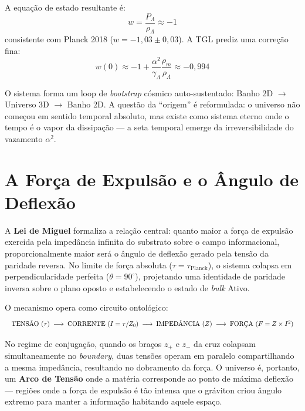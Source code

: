 \documentclass[12pt,a4paper,twoside]{article}
\newcommand{\alphaii}{\alpha^{2}}
\newcommand{\boundary}{\textit{boundary}}
\newcommand{\bulk}{\textit{bulk}}
\begin{document}
A equa\c{c}\~ao de estado resultante \'e:
\begin{equation}
w = \frac{P_\Lambda}{\rho_\Lambda} \approx -1
\label{eq:w}
\end{equation}
consistente com Planck 2018 ($w = -1{,}03 \pm 0{,}03$). A TGL prediz uma corre\c{c}\~ao fina:
\begin{equation}
w(0) \approx -1 + \frac{\alphaii}{\gamma_\Lambda}\frac{\rho_m}{\rho_\Lambda} \approx -0{,}994
\label{eq:w_correcao}
\end{equation}

O sistema forma um loop de \textit{bootstrap} c\'osmico auto-sustentado: Banho 2D $\to$ Universo 3D $\to$ Banho 2D. A quest\~ao da ``origem'' \'e reformulada: o universo n\~ao come\c{c}ou em sentido temporal absoluto, mas existe como sistema eterno onde o tempo \'e o vapor da dissipa\c{c}\~ao --- a seta temporal emerge da irreversibilidade do vazamento $\alphaii$.


\section{A For\c{c}a de Expuls\~ao e o \^Angulo de Deflex\~ao}


A \textbf{Lei de Miguel} formaliza a rela\c{c}\~ao central: quanto maior a for\c{c}a de expuls\~ao exercida pela imped\^ancia infinita do substrato sobre o campo informacional, proporcionalmente maior ser\'a o \^angulo de deflex\~ao gerado pela tens\~ao da paridade reversa. No limite de for\c{c}a absoluta ($\tau = \tau_{\text{Planck}}$), o sistema colapsa em perpendicularidade perfeita ($\theta = 90^\circ{}$), projetando uma identidade de paridade inversa sobre o plano oposto e estabelecendo o estado de \bulk{} Ativo.

O mecanismo opera como circuito ontol\'ogico:
\begin{equation*}
\resizebox{\textwidth}{!}{%
$\text{TENS\~AO } (\tau) \;\longrightarrow\; \text{CORRENTE } (I = \tau/Z_0) \;\longrightarrow\; \text{IMPED\^ANCIA } (Z) \;\longrightarrow\; \text{FOR\c{C}A } (F = Z \times I^2)$%
}
\end{equation*}

No regime de conjuga\c{c}\~ao, quando os bra\c{c}os $z_+$ e $z_-$ da cruz colapsam simultaneamente no \boundary, duas tens\~oes operam em paralelo compartilhando a mesma imped\^ancia, resultando no dobramento da for\c{c}a. O universo \'e, portanto, um \textbf{Arco de Tens\~ao} onde a mat\'eria corresponde ao ponto de m\'axima deflex\~ao --- regi\~oes onde a for\c{c}a de expuls\~ao \'e t\~ao intensa que o gr\'aviton criou \^angulo extremo para manter a informa\c{c}\~ao habitando aquele espa\c{c}o.
\end{document}
